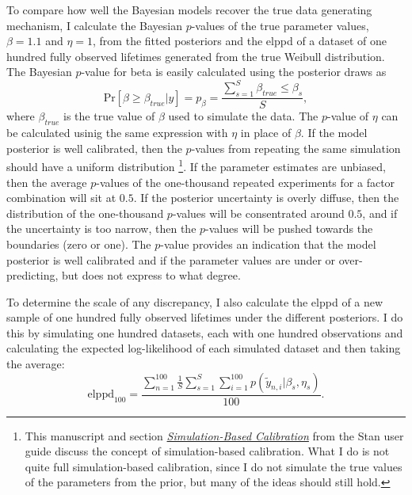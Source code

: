 To compare how well the Bayesian models recover the true data generating mechanism, I calculate the Bayesian $p$-values of the true parameter values, $\beta = 1.1$ and $\eta = 1$, from the fitted posteriors and the elppd of a dataset of one hundred fully observed lifetimes generated from the true Weibull distribution. The Bayesian $p$-value for beta is easily calculated using the posterior draws as \citep{BDA2020}
\begin{equation*}
    \text{Pr}\left[\beta \ge \beta_{true}|y\right] = p_{\beta} = \frac{\sum^{S}_{s = 1}{\beta_{true} \le \beta_s}}{S},
\end{equation*}
where $\beta_{true}$ is the true value of $\beta$ used to simulate the data. The $p$-value of $\eta$ can be calculated usinig the same expression with $\eta$ in place of $\beta$. If the model posterior is well calibrated, then the $p$-values from repeating the same simulation should have a uniform distribution \citep{talts2020, stan_user_guide2024}\footnote{This manuscript and section \href{https://mc-stan.org/docs/stan-users-guide/simulation-based-calibration.html}{\textit{Simulation-Based Calibration}} from the Stan user guide discuss the concept of simulation-based calibration. What I do is not quite full simulation-based calibration, since I do not simulate the true values of the parameters from the prior, but many of the ideas should still hold.}. If the parameter estimates are unbiased, then the average $p$-values of the one-thousand repeated experiments for a factor combination will sit at $0.5$. If the posterior uncertainty is overly diffuse, then the distribution of the one-thousand $p$-values will be consentrated around $0.5$, and if the uncertainty is too narrow, then the $p$-values will be pushed towards the boundaries (zero or one). The $p$-value provides an indication that the model posterior is well calibrated and if the parameter values are under or over-predicting, but does not express to what degree.

To determine the scale of any discrepancy, I also calculate the elppd of a new sample of one hundred fully observed lifetimes under the different posteriors. I do this by simulating one hundred datasets, each with one hundred observations and calculating the expected log-likelihood of each simulated dataset and then taking the average:
\begin{equation*}
    \label{eq:elppd-100}
    \text{elppd}_{100} = \frac{\sum_{n = 1}^{100}\frac{1}{S}\sum_{s = 1}^{S}\sum_{i = 1}^{100}p(\tilde{y}_{n, i}|\beta_s, \eta_s)}{100}.
\end{equation*}

